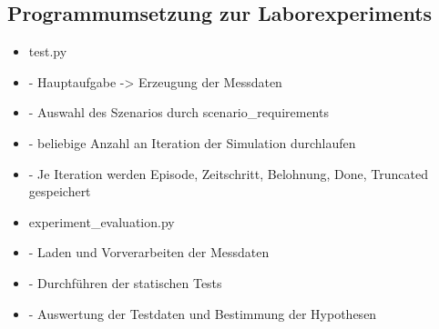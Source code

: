 \subsection{Programmumsetzung zur Laborexperiments}
\begin{itemize}
    \item test.py
    \item - Hauptaufgabe -> Erzeugung der Messdaten
    \item - Auswahl des Szenarios durch scenario\_requirements
    \item - beliebige Anzahl an Iteration der Simulation durchlaufen
    \item - Je Iteration werden Episode, Zeitschritt, Belohnung, Done, Truncated gespeichert
    \item experiment\_evaluation.py
    \item - Laden und Vorverarbeiten der Messdaten
    \item - Durchführen der statischen Tests
    \item - Auswertung der Testdaten und Bestimmung der Hypothesen
\end{itemize}
